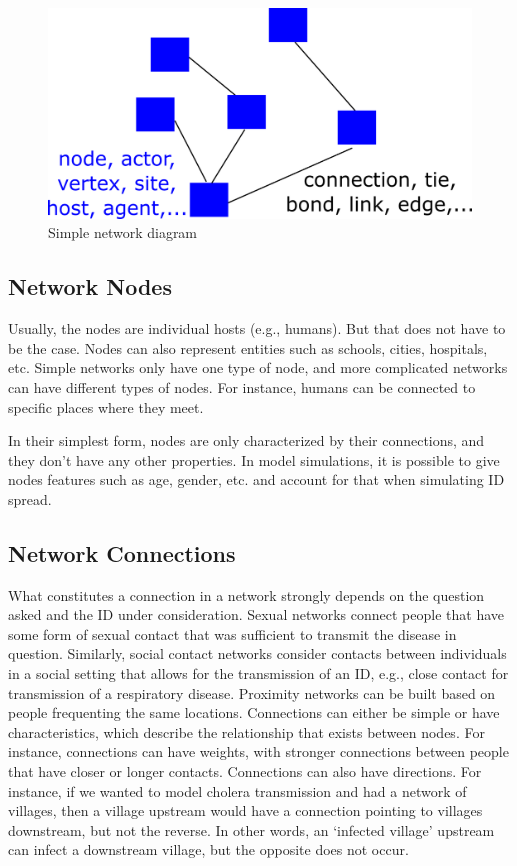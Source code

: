 \documentclass[]{article}
\theoremstyle{definition}
\theoremstyle{definition}
\theoremstyle{definition}
\theoremstyle{remark}
\begin{document}
\begin{figure}
\centering
\includegraphics{./images/network-diagram.png}
\caption{Simple network diagram}
\end{figure}

\subsection{Network Nodes}\label{network-nodes}

Usually, the nodes are individual hosts (e.g., humans). But that does
not have to be the case. Nodes can also represent entities such as
schools, cities, hospitals, etc. Simple networks only have one type of
node, and more complicated networks can have different types of nodes.
For instance, humans can be connected to specific places where they
meet.

In their simplest form, nodes are only characterized by their
connections, and they don't have any other properties. In model
simulations, it is possible to give nodes features such as age, gender,
etc. and account for that when simulating ID spread.

\subsection{Network Connections}\label{network-connections}

What constitutes a connection in a network strongly depends on the
question asked and the ID under consideration. Sexual networks connect
people that have some form of sexual contact that was sufficient to
transmit the disease in question. Similarly, social contact networks
consider contacts between individuals in a social setting that allows
for the transmission of an ID, e.g., close contact for transmission of a
respiratory disease. Proximity networks can be built based on people
frequenting the same locations. Connections can either be simple or have
characteristics, which describe the relationship that exists between
nodes. For instance, connections can have weights, with stronger
connections between people that have closer or longer contacts.
Connections can also have directions. For instance, if we wanted to
model cholera transmission and had a network of villages, then a village
upstream would have a connection pointing to villages downstream, but
not the reverse. In other words, an `infected village' upstream can
infect a downstream village, but the opposite does not occur.
\end{document}

